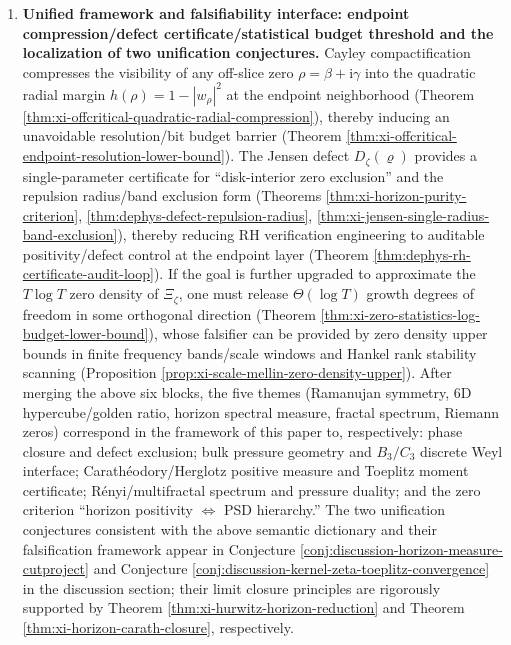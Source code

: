 \begin{enumerate}
  \item \textbf{Unified framework and falsifiability interface: endpoint compression/defect certificate/statistical budget threshold and the localization of two unification conjectures.}
  Cayley compactification compresses the visibility of any off-slice zero \(\rho=\beta+\mathrm{i}\gamma\) into the quadratic radial margin
  \(h(\rho)=1-|w_\rho|^2\) at the endpoint neighborhood (Theorem \ref{thm:xi-offcritical-quadratic-radial-compression}), thereby inducing an unavoidable resolution/bit budget barrier (Theorem \ref{thm:xi-offcritical-endpoint-resolution-lower-bound}).
  The Jensen defect \(D_{\zeta}(\varrho)\) provides a single-parameter certificate for ``disk-interior zero exclusion'' and the repulsion radius/band exclusion form (Theorems \ref{thm:xi-horizon-purity-criterion}, \ref{thm:dephys-defect-repulsion-radius}, \ref{thm:xi-jensen-single-radius-band-exclusion}), thereby reducing RH verification engineering to auditable positivity/defect control at the endpoint layer (Theorem \ref{thm:dephys-rh-certificate-audit-loop}).
  If the goal is further upgraded to approximate the \(T\log T\) zero density of \(\Xi_\zeta\), one must release \(\Theta(\log T)\) growth degrees of freedom in some orthogonal direction (Theorem \ref{thm:xi-zero-statistics-log-budget-lower-bound}), whose falsifier can be provided by zero density upper bounds in finite frequency bands/scale windows and Hankel rank stability scanning (Proposition \ref{prop:xi-scale-mellin-zero-density-upper}).
  After merging the above six blocks, the five themes (Ramanujan symmetry, \(6\)D hypercube/golden ratio, horizon spectral measure, fractal spectrum, Riemann zeros) correspond in the framework of this paper to, respectively:
  phase closure and defect exclusion; bulk pressure geometry and \(B_3/C_3\) discrete Weyl interface; Carath\'eodory/Herglotz positive measure and Toeplitz moment certificate; R\'enyi/multifractal spectrum and pressure duality; and the zero criterion ``horizon positivity \(\Leftrightarrow\) PSD hierarchy.''
  The two unification conjectures consistent with the above semantic dictionary and their falsification framework appear in Conjecture \ref{conj:discussion-horizon-measure-cutproject} and Conjecture \ref{conj:discussion-kernel-zeta-toeplitz-convergence} in the discussion section;
  their limit closure principles are rigorously supported by Theorem \ref{thm:xi-hurwitz-horizon-reduction} and Theorem \ref{thm:xi-horizon-carath-closure}, respectively.
\end{enumerate}

